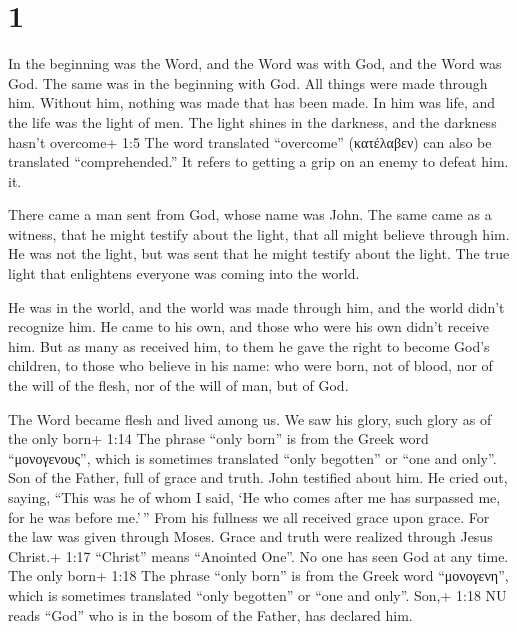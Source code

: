 \hypertarget{section}{%
\section{1}\label{section}}

 In the beginning was the Word, and the Word was with God,
and the Word was God.  The same was in the beginning with
God.  All things were made through him. Without him, nothing
was made that has been made.  In him was life, and the life
was the light of men.  The light shines in the darkness, and
the darkness hasn't overcome+ 1:5 The word translated ``overcome''
(κατέλαβεν) can also be translated ``comprehended.'' It refers to
getting a grip on an enemy to defeat him. it.

 There came a man sent from God, whose name was John.
 The same came as a witness, that he might testify about the
light, that all might believe through him.  He was not the
light, but was sent that he might testify about the light. 
The true light that enlightens everyone was coming into the world.

 He was in the world, and the world was made through him,
and the world didn't recognize him.  He came to his own,
and those who were his own didn't receive him.  But as many
as received him, to them he gave the right to become God's children, to
those who believe in his name:  who were born, not of
blood, nor of the will of the flesh, nor of the will of man, but of God.

 The Word became flesh and lived among us. We saw his
glory, such glory as of the only born+ 1:14 The phrase ``only born'' is
from the Greek word ``μονογενους'', which is sometimes translated ``only
begotten'' or ``one and only''. Son of the Father, full of grace and
truth.  John testified about him. He cried out, saying,
``This was he of whom I said, `He who comes after me has surpassed me,
for he was before me.'\,''  From his fullness we all
received grace upon grace.  For the law was given through
Moses. Grace and truth were realized through Jesus Christ.+ 1:17
``Christ'' means ``Anointed One''.  No one has seen God at
any time. The only born+ 1:18 The phrase ``only born'' is from the Greek
word ``μονογενη'', which is sometimes translated ``only begotten'' or
``one and only''. Son,+ 1:18 NU reads ``God'' who is in the bosom of the
Father, has declared him.


